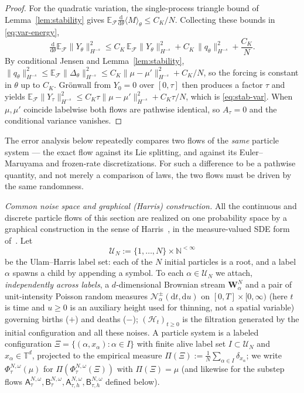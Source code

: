 \documentclass[a4paper,fleqn]{cas-sc}
\theoremstyle{definition}
\theoremstyle{remark}
\begin{document}
\begin{proof}
For the quadratic variation, the single-process triangle bound of Lemma~\ref{lem:stability}
gives $\mathbb E_{\mathcal F}\tfrac{\mathrm d}{\mathrm d\theta}\langle M\rangle_\theta\le C_K/N$.
Collecting these bounds in \eqref{eq:var-energy},
\[
\tfrac{\mathrm d}{\mathrm d\theta}\mathbb E_{\mathcal F}\|Y_\theta\|_{H^{-s}}^2
\le C_K\,\mathbb E_{\mathcal F}\|Y_\theta\|_{H^{-s}}^2+C_K\,\|q_\theta\|_{H^{-s}}^2+\frac{C_K}{N}.
\]
By conditional Jensen and Lemma~\ref{lem:stability},
$\|q_\theta\|_{H^{-s}}^2\le\mathbb E_{\mathcal F}\|\Delta_\theta\|_{H^{-s}}^2
\le C_K\|\mu-\mu'\|_{H^{-s}}^2+C_K/N$, so the forcing is constant in $\theta$ up to $C_K$.
Gr\"onwall from $Y_0=0$ over $[0,\tau]$ then produces a factor $\tau$ and yields
$\mathbb E_{\mathcal F}\|Y_\tau\|_{H^{-s}}^2\le C_K\tau\|\mu-\mu'\|_{H^{-s}}^2+C_K\tau/N$,
which is \eqref{eq:stab-var}. When $\mu,\mu'$ coincide labelwise both flows are pathwise
identical, so $A_\tau=0$ and the conditional variance vanishes.
\end{proof}

The error analysis below repeatedly compares two flows of the \emph{same}
particle system --- the exact flow against its Lie splitting, and against its
Euler--Maruyama and frozen-rate discretizations. For such a difference to be a
pathwise quantity, and not merely a comparison of laws, the two flows must be
driven by the same randomness.

\emph{Common noise space and graphical (Harris) construction.} All the continuous and discrete particle flows of this section
are realized on one probability space by a graphical construction in the sense of
Harris~\cite{harris1972nearest,harris1978additive}, in the measure-valued SDE form
of~\cite{fournier2004microscopic,bansaye2015stochastic}. Let
\[
\mathcal U_N:=\{1,\ldots,N\}\times\mathbb N^{<\infty}
\]
be the Ulam--Harris label set: each of the $N$ initial particles is a root, and a
label $\alpha$ spawns a child by appending a symbol. To each $\alpha\in\mathcal U_N$
we attach, \emph{independently across labels}, a $d$-dimensional Brownian stream
$\mathbf W^N_\alpha$ and a pair of unit-intensity Poisson random measures
$\mathcal N^{\pm}_\alpha(\mathrm dt,\mathrm du)$ on $[0,T]\times[0,\infty)$ (here $t$ is
time and $u\ge0$ is an auxiliary height used for thinning, not a spatial variable)
governing births ($+$) and deaths ($-$); $(\mathcal H_t)_{t\ge0}$ is the filtration generated by
the initial configuration and all these noises. A particle system is a labeled
configuration $\Xi=\{(\alpha,x_\alpha):\alpha\in I\}$ with finite alive label set
$I\subset\mathcal U_N$ and $x_\alpha\in\mathbb T^d$, projected to the empirical measure
$\Pi(\Xi):=\frac1N\sum_{\alpha\in I}\delta_{x_\alpha}$; we write
$\Phi^{N,\omega}_\tau(\mu)$ for $\Pi(\Phi^{N,\omega}_\tau(\Xi))$ with $\Pi(\Xi)=\mu$
(and likewise for the substep flows $\mathsf A^{N,\omega}_\tau,\mathsf B^{N,\omega}_\tau,
\mathsf A^{N,\omega}_{\tau,h},\mathsf B^{N,\omega}_{\tau,h}$ defined below).
\end{document}
